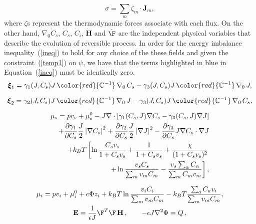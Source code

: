 \begin{equation}
\sigma = \sum_m \zeta_m \cdot \mathbf{J}_m,
\label{dis}
\end{equation}
where $\zeta$s represent the thermodynamic forces associate with each flux. On the other hand, $\nabla_0 \dot{C}_s$, $\dot{C}_s$, $\dot{C}_i$, $\mathbf{\dot{H}}$ and $\dot{\F}$ are the independent physical variables that describe the evolution of reversible process. In order for the energy imbalance inequality~(\ref{ineq}) to hold for any choice of the these fields and given the constraint~(\ref{temp1}) on $\psi$, we have that the terms highlighted in blue in Equation~(\ref{ineq}) must be identically zero. 
\begin{gather}
\boldsymbol{\xi}_1 = \gamma_1(J,C_s) J \,\color{red}{\mathbb{C}^{-1}} \,\nabla_0 \,C_s-\gamma_3(J,C_s) J \,\color{red}{\mathbb{C}^{-1}} \,\nabla_0 \,J,\label{sys1}\\[2mm]
\boldsymbol{\xi}_2 = \gamma_2(J,C_s) J \,\color{red}{\mathbb{C}^{-1}} \,\nabla_0 \,J-\gamma_3(J,C_s) J \,\color{red}{\mathbb{C}^{-1}} \,\nabla_0 \,C_s,\\[2mm]
\begin{aligned}
\mu_s = p v_s + \mu_s^0 -J\nabla\cdot\left[\gamma_1(C_s,J) \nabla C_s- \gamma_3(C_s,J)\nabla J\right] \\
+\frac{\partial \gamma_1}{\partial C_s}\frac{J}{2}\left|\nabla C_s\right|^2+\frac{\partial \gamma_2}{\partial C_s}\frac{J}{2}\left|\nabla J\right|^2-\frac{\partial \gamma_3}{\partial C_s}J\nabla C_s\cdot \nabla J\\
+ k_BT\left[\ln \frac{C_s v_s}{1+C_s v_s}+ \frac{1}{1+C_sv_s}
 +\frac{\chi}{(1+C_s v_s)^2} \right.\\
 \left.+ \ln \frac{v_s C_s}{\sum_m v_mC_m} - \frac{v_s \sum_\alpha C_\alpha}{\sum_m C_m v_m} \right], 
\end{aligned}\label{gov1}\\[2.5mm]
\mu_i = p v_i + \mu^0_i + e\Phi z_i + k_BT \ln \frac{v_iC_i}{\sum_m v_m C_m} - k_BT \frac{\sum_a C_a v_i}{\sum_m v_m C_m},\label{mu}\\
\mathbf{E} = \frac{1}{\epsilon J} \F^T \F\, \mathbf{H}\, , \qquad -\epsilon J \nabla^2 \Phi = Q\, ,\label{sys2}
\end{gather}
